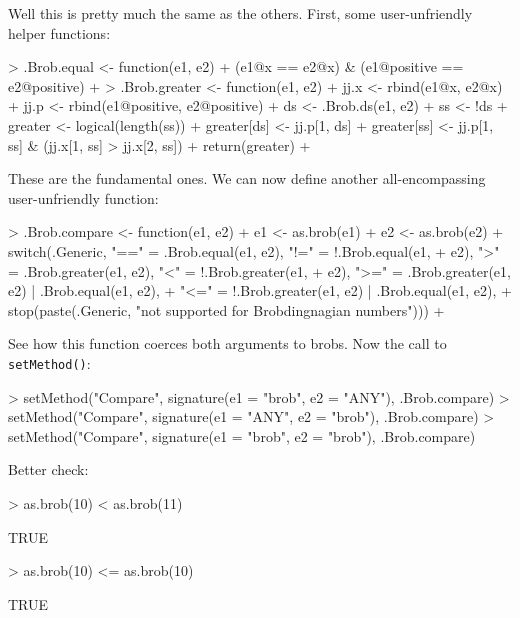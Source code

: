 \documentclass[a4paper]{article}
\begin{document}
Well this is pretty much the same as the others.
First, some user-unfriendly helper functions:

\begin{Schunk}
\begin{Sinput}
> .Brob.equal <- function(e1, e2) {
+     (e1@x == e2@x) & (e1@positive == e2@positive)
+ }
> .Brob.greater <- function(e1, e2) {
+     jj.x <- rbind(e1@x, e2@x)
+     jj.p <- rbind(e1@positive, e2@positive)
+     ds <- .Brob.ds(e1, e2)
+     ss <- !ds
+     greater <- logical(length(ss))
+     greater[ds] <- jj.p[1, ds]
+     greater[ss] <- jj.p[1, ss] & (jj.x[1, ss] > jj.x[2, ss])
+     return(greater)
+ }
\end{Sinput}
\end{Schunk}

These are the fundamental ones.  We can now define another
all-encompassing user-unfriendly function:

\begin{Schunk}
\begin{Sinput}
> .Brob.compare <- function(e1, e2) {
+     e1 <- as.brob(e1)
+     e2 <- as.brob(e2)
+     switch(.Generic, "==" = .Brob.equal(e1, e2), "!=" = !.Brob.equal(e1, 
+         e2), ">" = .Brob.greater(e1, e2), "<" = !.Brob.greater(e1, 
+         e2), ">=" = .Brob.greater(e1, e2) | .Brob.equal(e1, e2), 
+         "<=" = !.Brob.greater(e1, e2) | .Brob.equal(e1, e2), 
+         stop(paste(.Generic, "not supported for Brobdingnagian numbers")))
+ }
\end{Sinput}
\end{Schunk}

See how this function coerces both arguments to brobs.
Now the call to {\tt setMethod()}:

\begin{Schunk}
\begin{Sinput}
> setMethod("Compare", signature(e1 = "brob", e2 = "ANY"), .Brob.compare)
> setMethod("Compare", signature(e1 = "ANY", e2 = "brob"), .Brob.compare)
> setMethod("Compare", signature(e1 = "brob", e2 = "brob"), .Brob.compare)
\end{Sinput}
\end{Schunk}

Better check:

\begin{Schunk}
\begin{Sinput}
> as.brob(10) < as.brob(11)
\end{Sinput}
\begin{Soutput}
[1] TRUE
\end{Soutput}
\begin{Sinput}
> as.brob(10) <= as.brob(10)
\end{Sinput}
\begin{Soutput}
[1] TRUE
\end{Soutput}
\end{Schunk}
\end{document}
